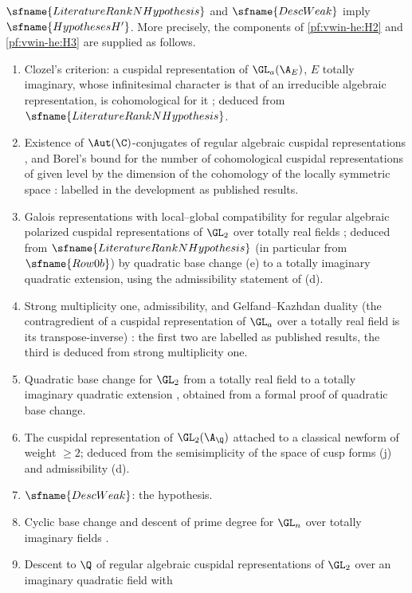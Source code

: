 \begin{proposition}\label{pf:vwin:hprime}
$\sfname{LiteratureRankNHypothesis}$ and $\sfname{DescWeak}$ imply $\sfname{HypothesesH'}$. More precisely, the
components of \ref{pf:vwin-he:H2} and \ref{pf:vwin-he:H3} are supplied as follows.
\begin{enumerate}
\item[(a)] Clozel's criterion: a cuspidal representation of $\GL_a(\A_E)$, $E$ totally imaginary, whose infinitesimal
character is that of an irreducible algebraic representation, is cohomological for it \cite{Clozel1990}; deduced from
$\sfname{LiteratureRankNHypothesis}$.
\item[(b)] Existence of $\Aut(\C)$-conjugates of regular algebraic cuspidal representations \cite{Clozel1990}, and Borel's
bound for the number of cohomological cuspidal representations of given level by the dimension of the cohomology of the
locally symmetric space \cite{Borel1983}: labelled in the development as published results.
\item[(c)] Galois representations with local--global compatibility for regular algebraic polarized cuspidal
representations of $\GL_2$ over totally real fields \cite{Carayol1986,Taylor1989}; deduced from
$\sfname{LiteratureRankNHypothesis}$ (in particular from $\sfname{Row0b}$) by quadratic base change (e) to a totally
imaginary quadratic extension, using the admissibility statement of (d).
\item[(d)] Strong multiplicity one, admissibility, and Gelfand--Kazhdan duality (the contragredient of a cuspidal
representation of $\GL_a$ over a totally real field is its transpose-inverse) \cite{JacquetShalika1981}: the first two are
labelled as published results, the third is deduced from strong multiplicity one.
\item[(e)] Quadratic base change for $\GL_2$ from a totally real field to a totally imaginary quadratic extension
\cite{Langlands1980}, obtained from a formal proof of quadratic base change.
\item[(f)] The cuspidal representation of $\GL_2(\A_\Q)$ attached to a classical newform of weight $\ge2$; deduced from
the semisimplicity of the space of cusp forms (j) and admissibility (d).
\item[(g)] $\sfname{DescWeak}$: the hypothesis.
\item[(h)] Cyclic base change and descent of prime degree for $\GL_n$ over totally imaginary fields \cite{ArthurClozel1989}.
\item[(i)] Descent to $\Q$ of regular algebraic cuspidal representations of $\GL_2$ over an imaginary quadratic field with

\end{enumerate}
\end{proposition}
